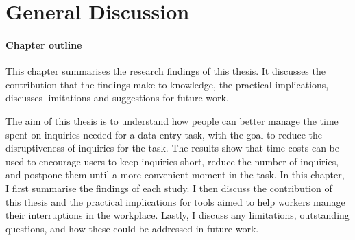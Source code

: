 \chapter{General Discussion}\label{ch:Discussion}

\begin{mynote}
\subsubsection{Chapter outline}
This chapter summarises the research findings of this thesis. It discusses the contribution that the findings make to knowledge, the practical implications, discusses limitations and suggestions for future work.
\end{mynote}

The aim of this thesis is to understand how people can better manage the time spent on inquiries needed for a data entry task, with the goal to reduce the disruptiveness of inquiries for the task. The results show that time costs can be used to encourage users to keep inquiries short, reduce the number of inquiries, and postpone them until a more convenient moment in the task. In this chapter, I first summarise the findings of each study. I then discuss the contribution of this thesis and the practical implications for tools aimed to help workers manage their interruptions in the workplace. Lastly, I discuss any limitations, outstanding questions, and how these could be addressed in future work. 

